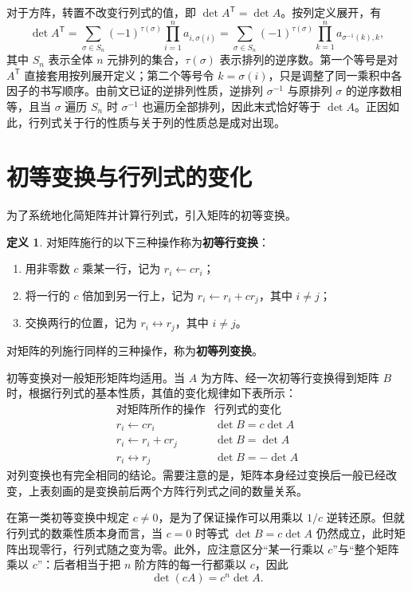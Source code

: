 \documentclass[UTF8, fontset=fandol, a4paper, 12pt]{ctexart}
\theoremstyle{definition}
\newtheorem{definition}[theorem]{定义}
\begin{document}
对于方阵，转置不改变行列式的值，即 $\det A^{\mathsf T}=\det A$。按列定义展开，有
\[
 \det A^{\mathsf T}
 =\sum_{\sigma\in S_n}(-1)^{\tau(\sigma)}\prod_{i=1}^n a_{i,\sigma(i)}
 =\sum_{\sigma\in S_n}(-1)^{\tau(\sigma)}\prod_{k=1}^n a_{\sigma^{-1}(k),k},
\]
其中 $S_n$ 表示全体 $n$ 元排列的集合，$\tau(\sigma)$ 表示排列的逆序数。第一个等号是对 $A^{\mathsf T}$ 直接套用按列展开定义；第二个等号令 $k=\sigma(i)$，只是调整了同一乘积中各因子的书写顺序。由前文已证的逆排列性质，逆排列 $\sigma^{-1}$ 与原排列 $\sigma$ 的逆序数相等，且当 $\sigma$ 遍历 $S_n$ 时 $\sigma^{-1}$ 也遍历全部排列，因此末式恰好等于 $\det A$。正因如此，行列式关于行的性质与关于列的性质总是成对出现。

\section{初等变换与行列式的变化}

为了系统地化简矩阵并计算行列式，引入矩阵的初等变换。

\begin{definition}
对矩阵施行的以下三种操作称为\textbf{初等行变换}：
\begin{enumerate}
 \item 用非零数 $c$ 乘某一行，记为 $r_i\leftarrow c r_i$；
 \item 将一行的 $c$ 倍加到另一行上，记为 $r_i\leftarrow r_i+c r_j$，其中 $i\ne j$；
 \item 交换两行的位置，记为 $r_i\leftrightarrow r_j$，其中 $i\ne j$。
\end{enumerate}
对矩阵的列施行同样的三种操作，称为\textbf{初等列变换}。
\end{definition}

初等变换对一般矩形矩阵均适用。当 $A$ 为方阵、经一次初等行变换得到矩阵 $B$ 时，根据行列式的基本性质，其值的变化规律如下表所示：
\[
\begin{array}{c|c}
 \text{对矩阵所作的操作}&\text{行列式的变化}\\ \hline
 r_i\leftarrow c r_i&\det B=c\det A\\
 r_i\leftarrow r_i+c r_j&\det B=\det A\\
 r_i\leftrightarrow r_j&\det B=-\det A
\end{array}
\]
对列变换也有完全相同的结论。需要注意的是，矩阵本身经过变换后一般已经改变，上表刻画的是变换前后两个方阵行列式之间的数量关系。

在第一类初等变换中规定 $c\ne0$，是为了保证操作可以用乘以 $1/c$ 逆转还原。但就行列式的数乘性质本身而言，当 $c=0$ 时等式 $\det B=c\det A$ 仍然成立，此时矩阵出现零行，行列式随之变为零。此外，应注意区分“某一行乘以 $c$”与“整个矩阵乘以 $c$”：后者相当于把 $n$ 阶方阵的每一行都乘以 $c$，因此
\[
 \det(cA)=c^n\det A.
\]
\end{document}
